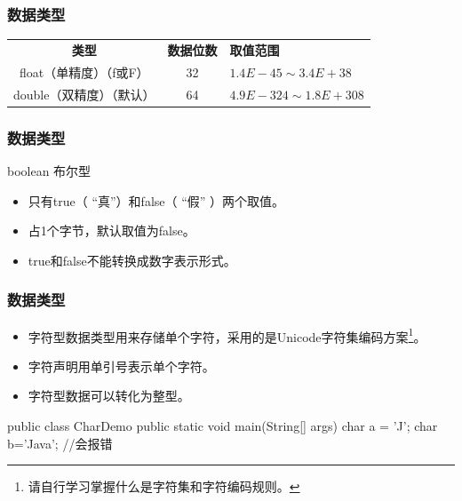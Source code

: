 \begin{frame}[fragile]
  \frametitle{数据类型}

  \begin{table}
    \footnotesize
    \setlength{\extrarowheight}{1.2mm}
    \begin{tabular}{c|c|p{5cm}}
      {\bf 类型} & {\bf 数据位数} & {\bf 取值范围}   \\
      float（单精度）（f或F） & 32 & $1.4E-45 \sim 3.4E+38$\\
      double（双精度）（默认） & 64 & $4.9E-324 \sim 1.8E+308$\\
    \end{tabular}
  \end{table}  
\end{frame}

\begin{frame}[fragile]
  \frametitle{数据类型}
   boolean 布尔型

  \begin{itemize}
  \item 只有true（ “真”）和false（ “假” ）两个取值。
  \item 占1个字节，默认取值为false。
  \item true和false不能转换成数字表示形式。
  \end{itemize}
\end{frame}

\begin{frame}[fragile]
  \frametitle{数据类型}
  \begin{itemize}
  \item 字符型数据类型用来存储单个字符，采用的是Unicode字符集编码方案\footnote{请自行学习掌握什么是字符集和字符编码规则。}。
  \item 字符声明用单引号表示单个字符。
  \item 字符型数据可以转化为整型。
  \end{itemize}

  
  \begin{javaCode}
    public class CharDemo {
      public static void main(String[] args) {
        char a = 'J';
        char b='Java';  //会报错
      }
    }
  \end{javaCode}
\end{frame}

